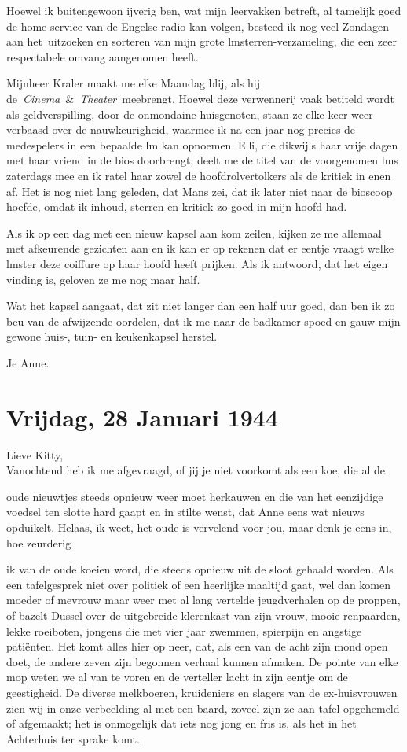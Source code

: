 \documentclass{book}
\begin{document}
Hoewel ik buitengewoon ijverig ben, wat mijn leervakken betreft, al
tamelijk goed de home-service van de Engelse radio kan volgen, besteed
ik nog veel Zondagen aan het~uitzoeken en sorteren van mijn grote
lmsterren-verzameling, die een zeer respectabele omvang aangenomen
heeft.

Mijnheer Kraler maakt me elke Maandag blij, als hij
de~\emph{Cinema}~\&~\emph{Theater}~meebrengt. Hoewel deze verwennerij
vaak betiteld wordt als geldverspilling, door de onmondaine huisgenoten,
staan ze elke keer weer verbaasd over de nauwkeurigheid, waarmee ik na
een jaar nog precies de medespelers in een bepaalde lm kan opnoemen.
Elli, die dikwijls haar vrije dagen met haar vriend in de bios
doorbrengt, deelt me de titel van de voorgenomen lms zaterdags mee en ik
ratel haar zowel de hoofdrolvertolkers als de kritiek in enen af. Het is
nog niet lang geleden, dat Mans zei, dat ik later niet naar de bioscoop
hoefde, omdat ik inhoud, sterren en kritiek zo goed in mijn hoofd had.

Als ik op een dag met een nieuw kapsel aan kom zeilen, kijken ze me
allemaal met afkeurende gezichten aan en ik kan er op rekenen dat er
eentje vraagt welke lmster deze coiffure op haar hoofd heeft prijken.
Als ik antwoord, dat het eigen vinding is, geloven ze me nog maar half.

Wat het kapsel aangaat, dat zit niet langer dan een half uur goed, dan
ben ik zo beu van de afwijzende oordelen, dat ik me naar de badkamer
spoed en gauw mijn gewone huis-, tuin- en keukenkapsel herstel.

Je Anne.

\chapter{Vrijdag, 28 Januari 1944}

Lieve Kitty,\\Vanochtend heb ik me afgevraagd, of jij je niet voorkomt
als een koe, die al de

oude nieuwtjes steeds opnieuw weer moet herkauwen en die van het
eenzijdige voedsel ten slotte hard gaapt en in stilte wenst, dat Anne
eens wat nieuws opduikelt. Helaas, ik weet, het oude is vervelend voor
jou, maar denk je eens in, hoe zeurderig

ik van de oude koeien word, die steeds opnieuw uit de sloot gehaald
worden. Als een tafelgesprek niet over politiek of een heerlijke
maaltijd gaat, wel dan komen moeder of mevrouw maar weer met al lang
vertelde jeugdverhalen op de proppen, of bazelt Dussel over de
uitgebreide klerenkast van zijn vrouw, mooie renpaarden, lekke
roeiboten, jongens die met vier jaar zwemmen, spierpijn en angstige
patiënten. Het komt alles hier op neer, dat, als een van de acht zijn
mond open doet, de andere zeven zijn begonnen verhaal kunnen afmaken. De
pointe van elke mop weten we al van te voren en de verteller lacht in
zijn eentje om de geestigheid. De diverse melkboeren, kruideniers en
slagers van de ex-huisvrouwen zien wij in onze verbeelding al met een
baard, zoveel zijn ze aan tafel opgehemeld of afgemaakt; het is
onmogelijk dat iets nog jong en fris is, als het in het Achterhuis ter
sprake komt.
\end{document}
